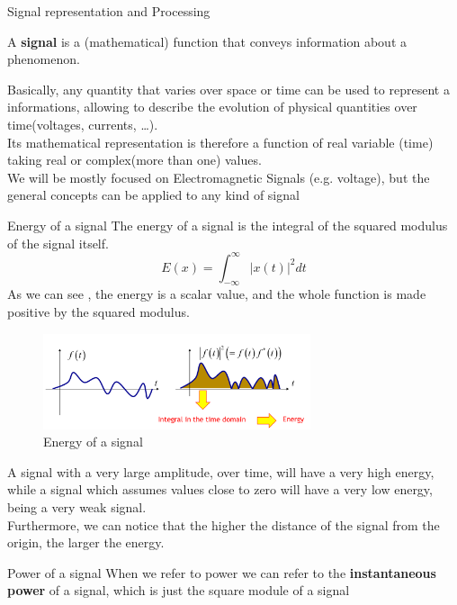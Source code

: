 \begin{section}{Signal representation and Processing}
  \begin{boxH}
    A \textbf{signal} is a (mathematical) function that conveys information about a phenomenon.
  \end{boxH}
  Basically, any quantity that varies over space or time can be used to represent a informations,
  allowing to describe the evolution of physical quantities over time(voltages, currents, \dots).\\
  Its mathematical representation is therefore a function of real variable (time) taking real or 
  complex(more than one) values.\\
  We will be mostly focused on Electromagnetic Signals (e.g. voltage), but the general concepts 
  can be applied to any kind of signal
  \begin{subsection}{Energy of a signal}
    The energy of a signal is the integral of the squared modulus of the signal itself.
    \begin{equation}
      E(x) = \int_{-\infty}^{\infty} |x(t)|^2 dt
    \end{equation}
    As we can see , the energy is a scalar value, and the whole function is made positive by the
    squared modulus.\\
    \begin{figure}[h]
      \centering
      \includegraphics[width=0.7\textwidth]{img/wireless/energy signal.png}
      \caption{Energy of a signal}
      \label{fig:Energy of a signal}
    \end{figure}
    A signal with a very large amplitude, over time, will have a very high energy, while a signal
    which assumes values close to zero will have a very low energy, being a very weak signal.\\
    Furthermore, we can notice that the higher the distance of the signal from the origin, the
    larger the energy.
  \end{subsection}
  \begin{subsection}{Power of a signal}
    When we refer to power we can refer to the \textbf{instantaneous power} of a signal, which is just the 
    square module of a signal

\end{subsection}
\end{section}
